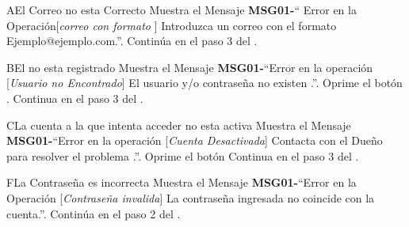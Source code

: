 	\begin{UCtrayectoriaA}{A}{El Correo no esta Correcto}
			\UCpaso Muestra el Mensaje {\bf MSG01-}`` Error en la Operación[{\em correo con formato }] Introduzca un correo con el formato Ejemplo@ejemplo.com.''.
			\UCpaso Continúa en el paso 3 del .
		\end{UCtrayectoriaA}
		\begin{UCtrayectoriaA}{B}{El \UCactor no esta registrado}
			\UCpaso Muestra el Mensaje {\bf MSG01-}``Error en la operación [{\em Usuario no Encontrado}] El usuario y/o contraseña no existen .''.
			\UCpaso[\UCactor] Oprime el botón .
			\UCpaso[] Continua en el paso 3 del .
		\end{UCtrayectoriaA}		
		\begin{UCtrayectoriaA}{C}{La cuenta a la que intenta acceder no esta activa}
			\UCpaso Muestra el Mensaje {\bf MSG01-}``Error en la operación [{\em Cuenta Desactivada}] Contacta con el Dueño para resolver el problema .''.
			\UCpaso[\UCactor] Oprime el botón 
			\UCpaso Continua en el paso 3 del .
		\end{UCtrayectoriaA}
		\begin{UCtrayectoriaA}{F}{La Contraseña es incorrecta}
			\UCpaso Muestra el Mensaje {\bf MSG01-}``Error en la Operación [{\em Contraseña invalida}] La contraseña ingresada no coincide con la cuenta.''.
			\UCpaso Continúa en el paso 2 del .
		\end{UCtrayectoriaA}
